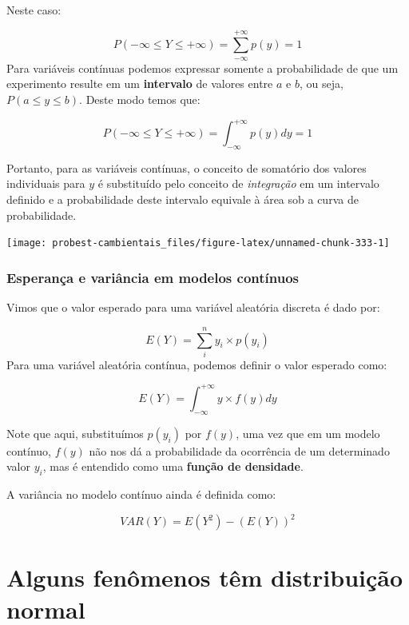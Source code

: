 \documentclass[
]{book}
\begin{document}
Neste caso:

\[P(-\infty \le Y \le +\infty) = \sum_{-\infty}^{+\infty} p(y) = 1\]
Para variáveis contínuas podemos expressar somente a probabilidade de que um experimento resulte em um \textbf{intervalo} de valores entre \(a\) e \(b\), ou seja, \(P(a \le y \le b)\). Deste modo temos que:

\[P(-\infty \le Y \le +\infty) = \int_{-\infty}^{+\infty}p(y) dy = 1\]

Portanto, para as variáveis contínuas, o conceito de somatório dos valores individuais para \(y\) é substituído pelo conceito de \emph{integração} em um intervalo definido e a probabilidade deste intervalo equivale à área sob a curva de probabilidade.

\begin{center}\texttt{[image: probest-cambientais\_files/figure-latex/unnamed-chunk-333-1]} \end{center}

\hypertarget{esperanuxe7a-e-variuxe2ncia-em-modelos-contuxednuos}{%
\subsubsection*{Esperança e variância em modelos contínuos}\label{esperanuxe7a-e-variuxe2ncia-em-modelos-contuxednuos}}

Vimos que o valor esperado para uma variável aleatória discreta é dado por:

\[E(Y) = \sum_i^n y_i \times p(y_i)\]
Para uma variável aleatória contínua, podemos definir o valor esperado como:

\[E(Y) = \int_{-\infty}^{+\infty}y \times f(y) dy\]

Note que aqui, substituímos \(p(y_i)\) por \(f(y)\), uma vez que em um modelo contínuo, \(f(y)\) não nos dá a probabilidade da ocorrência de um determinado valor \(y_i\), mas é entendido como uma \textbf{função de densidade}.

A variância no modelo contínuo ainda é definida como:

\[VAR(Y) = E(Y^2) - (E(Y))^2\]

\hypertarget{alguns-fenuxf4menos-tuxeam-distribuiuxe7uxe3o-normal}{%
\section{Alguns fenômenos têm distribuição normal}\label{alguns-fenuxf4menos-tuxeam-distribuiuxe7uxe3o-normal}}
\end{document}
